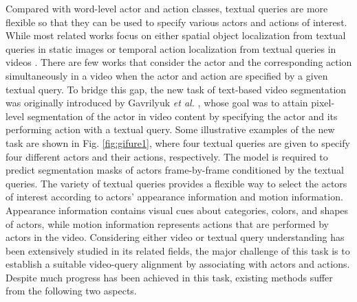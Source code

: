\documentclass[journal]{IEEEtran}
\begin{document}
Compared with word-level actor and action classes, textual queries are more flexible so that they can be used to specify various actors and actions of interest. While most related works focus on either spatial object localization from textual queries in static images \cite{yu2016modeling,hu2016segmentation,liu2017recurrent} or temporal action localization from textual queries in videos \cite{anne2017localizing,gao2017tall}. There are few works that consider the actor and the corresponding action simultaneously in a video when the actor and action are specified by a given textual query. To bridge this gap, the new task of text-based video segmentation was originally introduced by Gavrilyuk \emph{et al.} \cite{gavrilyuk2018actor},  whose goal was to attain pixel-level segmentation of the actor in video content by specifying the actor and its performing action with a textual query. Some illustrative examples of the new task are shown in Fig. \ref{fig:gifure1}, where four textual queries are given to specify four different actors and their actions, respectively. The model is required to predict segmentation masks of actors frame-by-frame conditioned by the textual queries. The variety of textual queries provides a flexible way to select the actors of interest according to actors' appearance information and motion information. Appearance information contains visual cues about categories, colors, and shapes of actors, while motion information represents actions that are performed by actors in the video. Considering either video or textual query understanding has been extensively studied in its related fields, the major challenge of this task is to establish a suitable video-query alignment by associating with actors and actions. Despite much progress has been achieved in this task, existing methods \cite{gavrilyuk2018actor,wang2019asymmetric,wang2020context,mcintosh2018multi} suffer from the following two aspects.
\end{document}
